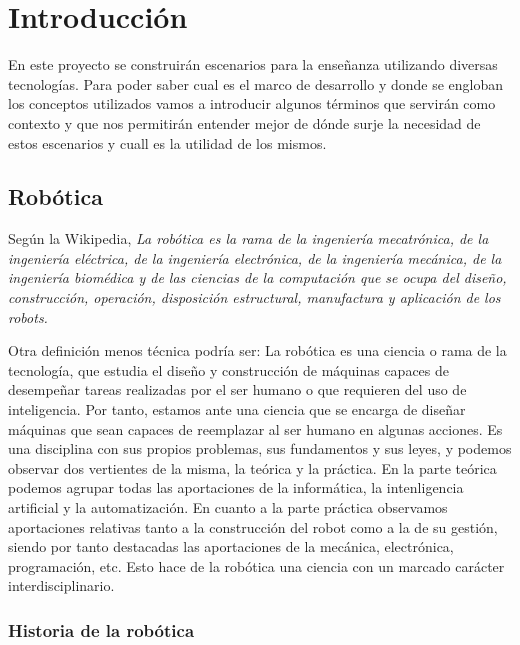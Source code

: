 \chapter{Introducción}
\label{ch:Introduccion}

En este proyecto se construirán escenarios para la enseñanza utilizando diversas tecnologías. Para poder saber cual es el marco de desarrollo y donde se engloban los conceptos utilizados vamos a introducir algunos términos que servirán como contexto y que nos permitirán entender mejor de dónde surje la necesidad de estos escenarios y cuall es la utilidad de los mismos.

\section{Robótica}
\label{sec:intr_robotica}

Según la Wikipedia\cite{wikipedia}, \textit{La robótica es la rama de la ingeniería mecatrónica, de la ingeniería eléctrica, de la ingeniería electrónica, de la ingeniería mecánica, de la ingeniería biomédica y de las ciencias de la computación que se ocupa del diseño, construcción, operación, disposición estructural, manufactura y aplicación de los robots.}

Otra definición menos técnica podría ser: La robótica es una ciencia o rama de la tecnología, que estudia el diseño y construcción de máquinas capaces de desempeñar tareas realizadas por el ser humano o que requieren del uso de inteligencia. Por tanto, estamos ante una ciencia que se encarga de diseñar máquinas que sean capaces de reemplazar al ser humano en algunas acciones. Es una disciplina con sus propios problemas, sus fundamentos y sus leyes, y podemos observar dos vertientes de la misma, la teórica y la práctica. En la parte teórica podemos agrupar todas las aportaciones de la informática, la intenligencia artificial y la automatización. En cuanto a la parte práctica observamos aportaciones relativas tanto a la construcción del robot como a la de su gestión, siendo por tanto destacadas las aportaciones de la mecánica, electrónica, programación, etc. Esto hace de la robótica una ciencia con un marcado carácter interdisciplinario.

\subsection{Historia de la robótica}
\label{subsec:intr_historiarobotica}

